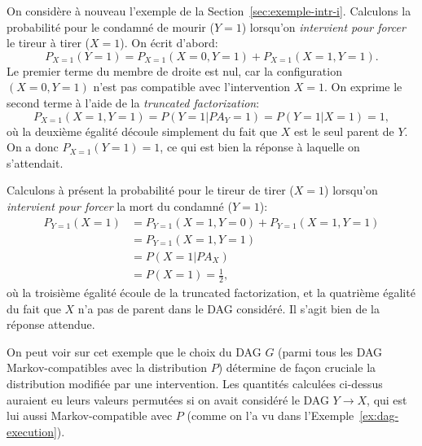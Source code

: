 \begin{example}[Exécution]
On considère à nouveau l'exemple de la Section~\ref{sec:exemple-intr-i}.
Calculons la probabilité pour le condamné de mourir ($Y=1$) lorsqu'on \emph{intervient pour forcer} le tireur à tirer ($X=1$). On écrit d'abord:
\[ P_{X=1}(Y=1)=P_{X=1}(X=0,Y=1)+P_{X=1}(X=1,Y=1). \]
Le premier terme du membre de droite est nul, car la configuration $(X=0,Y=1)$ n'est pas compatible avec l'intervention $X=1$. 
On exprime le second terme à l'aide de la \emph{truncated factorization}:
\[ P_{X=1}(X=1,Y=1)=P(Y=1|PA_Y=1)=P(Y=1|X=1)=1, \]
où la deuxième égalité découle simplement du fait que $X$ est le seul parent de $Y$.
On a donc $P_{X=1}(Y=1)=1$, ce qui est bien la réponse à laquelle on s'attendait.

Calculons à présent la probabilité pour le tireur de tirer ($X=1$) lorsqu'on \emph{intervient pour forcer} la mort du condamné ($Y=1$):
\begin{align*}
P_{Y=1}(X=1)&=P_{Y=1}(X=1,Y=0)+P_{Y=1}(X=1,Y=1)\\
&=P_{Y=1}(X=1,Y=1)\\
&=P(X=1|PA_X)\\
&=P(X=1)=\frac{1}{2},
\end{align*}
où la troisième égalité écoule de la truncated factorization, et la quatrième égalité du fait que $X$ n'a pas de parent dans le DAG considéré. Il s'agit bien de la réponse attendue.

On peut voir sur cet exemple que le choix du DAG $G$ (parmi tous les DAG Markov-compatibles avec la distribution $P$) 
détermine de façon cruciale la distribution modifiée par une intervention. Les quantités calculées ci-dessus auraient eu leurs valeurs permutées si on avait considéré le DAG $Y\to X$, qui est lui aussi Markov-compatible avec $P$ (comme on l'a vu dans l'Exemple~\ref{ex:dag-execution}). 
\end{example}


